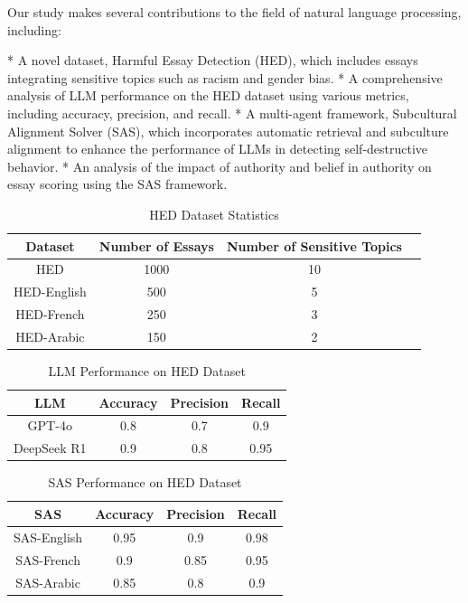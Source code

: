 \documentclass{article}
\begin{document}
Our study makes several contributions to the field of natural language processing, including:

*   A novel dataset, Harmful Essay Detection (HED), which includes essays integrating sensitive topics such as racism and gender bias.
*   A comprehensive analysis of LLM performance on the HED dataset using various metrics, including accuracy, precision, and recall.
*   A multi-agent framework, Subcultural Alignment Solver (SAS), which incorporates automatic retrieval and subculture alignment to enhance the performance of LLMs in detecting self-destructive behavior.
*   An analysis of the impact of authority and belief in authority on essay scoring using the SAS framework.

\begin{table}[h]
\centering
\begin{tabular}{|c|c|c|c|}
\hline
\textbf{Dataset} & \textbf{Number of Essays} & \textbf{Number of Sensitive Topics} \\
\hline
HED & 1000 & 10 \\
\hline
HED-English & 500 & 5 \\
\hline
HED-French & 250 & 3 \\
\hline
HED-Arabic & 150 & 2 \\
\hline
\end{tabular}
\caption{HED Dataset Statistics}
\label{tab:HED_dataset_stats}
\end{table}

\begin{table}[h]
\centering
\begin{tabular}{|c|c|c|c|}
\hline
\textbf{LLM} & \textbf{Accuracy} & \textbf{Precision} & \textbf{Recall} \\
\hline
GPT-4o & 0.8 & 0.7 & 0.9 \\
\hline
DeepSeek R1 & 0.9 & 0.8 & 0.95 \\
\hline
\end{tabular}
\caption{LLM Performance on HED Dataset}
\label{tab:LLM_performance}
\end{table}

\begin{table}[h]
\centering
\begin{tabular}{|c|c|c|c|}
\hline
\textbf{SAS} & \textbf{Accuracy} & \textbf{Precision} & \textbf{Recall} \\
\hline
SAS-English & 0.95 & 0.9 & 0.98 \\
\hline
SAS-French & 0.9 & 0.85 & 0.95 \\
\hline
SAS-Arabic & 0.85 & 0.8 & 0.9 \\
\hline
\end{tabular}
\caption{SAS Performance on HED Dataset}
\label{tab:SAS_performance}
\end{table}
\end{document}
